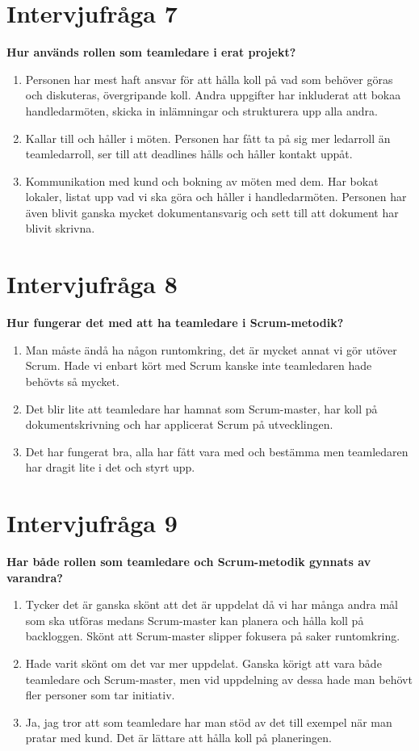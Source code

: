\section{Intervjufråga 7}
\textbf{Hur används rollen som teamledare i erat projekt?}
\begin{enumerate}
\item Personen har mest haft ansvar för att hålla koll på vad som behöver göras och diskuteras, övergripande koll. Andra uppgifter har inkluderat att bokaa handledarmöten, skicka in inlämningar och strukturera upp alla andra.
\item Kallar till och håller i möten. Personen har fått ta på sig mer ledarroll än teamledarroll, ser till att deadlines hålls och håller kontakt uppåt.
\item Kommunikation med kund och bokning av möten med dem. Har bokat lokaler, listat upp vad vi ska göra och håller i handledarmöten. Personen har även blivit ganska mycket dokumentansvarig och sett till att dokument har blivit skrivna.
\end{enumerate}

\section{Intervjufråga 8}
\textbf{Hur fungerar det med att ha teamledare i Scrum-metodik?}
\begin{enumerate}
\item Man måste ändå ha någon runtomkring, det är mycket annat vi gör utöver Scrum. Hade vi enbart kört med Scrum kanske inte teamledaren hade behövts så mycket.
\item Det blir lite att teamledare har hamnat som Scrum-master, har koll på dokumentskrivning och har applicerat Scrum på utvecklingen.
\item Det har fungerat bra, alla har fått vara med och bestämma men teamledaren har dragit lite i det och styrt upp.
\end{enumerate}

\section{Intervjufråga 9}
\textbf{Har både rollen som teamledare och Scrum-metodik gynnats av varandra?}
\begin{enumerate}
\item Tycker det är ganska skönt att det är uppdelat då vi har många andra mål som ska utföras medans Scrum-master kan planera och hålla koll på backloggen. Skönt att Scrum-master slipper fokusera på saker runtomkring.
\item Hade varit skönt om det var mer uppdelat. Ganska körigt att vara både teamledare och Scrum-master, men vid uppdelning av dessa hade man behövt fler personer som tar initiativ.
\item Ja, jag tror att som teamledare har man stöd av det till exempel när man pratar med kund. Det är lättare att hålla koll på planeringen.
\end{enumerate}


